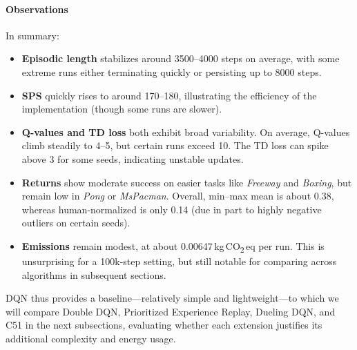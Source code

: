 \paragraph{Observations}
In summary:
\begin{itemize}
	\item \textbf{Episodic length} stabilizes around 3500--4000 steps on average, 
	with some extreme runs either terminating quickly or persisting up to 8000 steps.
	\item \textbf{SPS} quickly rises to around 170--180, illustrating the efficiency 
	of the implementation (though some runs are slower).
	\item \textbf{Q-values and TD loss} both exhibit broad variability. On average, 
	Q-values climb steadily to 4--5, but certain runs exceed 10. The TD loss 
	can spike above 3 for some seeds, indicating unstable updates.
	\item \textbf{Returns} show moderate success on easier tasks like \textit{Freeway} 
	and \textit{Boxing}, but remain low in \textit{Pong} or \textit{MsPacman}. Overall, 
	min--max mean is about 0.38, whereas human-normalized is only 0.14 (due in part 
	to highly negative outliers on certain seeds).
	\item \textbf{Emissions} remain modest, at about 0.00647\,kg\,CO\textsubscript{2}\,eq 
	per run. This is unsurprising for a 100k-step setting, but still notable for 
	comparing across algorithms in subsequent sections.
\end{itemize}

DQN thus provides a baseline—relatively simple and lightweight—to which we will 
compare Double DQN, Prioritized Experience Replay, Dueling DQN, and C51 
in the next subsections, evaluating whether each extension justifies 
its additional complexity and energy usage.


